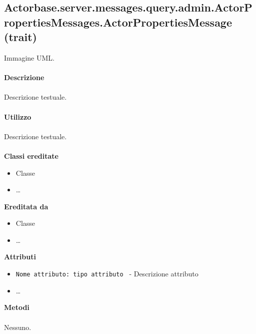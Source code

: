 \documentclass[a4paper]{article}
\begin{document}
\subsection{Actorbase.server.messages.query.admin.ActorPropertiesMessages.ActorPropertiesMessage (trait)}
		Immagine UML.
		\\ \\
		\textbf{Descrizione}
			\\ \\
			Descrizione testuale.
			\\ \\
		\textbf{Utilizzo}
			\\ \\
			Descrizione testuale.
			\\ \\
		\textbf{Classi ereditate}
			\begin{itemize}
				\item Classe
				\item \dots
			\end{itemize}
		\textbf{Ereditata da}
			\begin{itemize}
				\item Classe
				\item \dots
			\end{itemize}
		\textbf{Attributi}
			\begin{itemize}
				\item \texttt{Nome attributo: tipo attributo } - Descrizione attributo
				\item \dots
			\end{itemize}
		\textbf{Metodi}
			\\ \\
			Nessuno.
			
\end{document}
